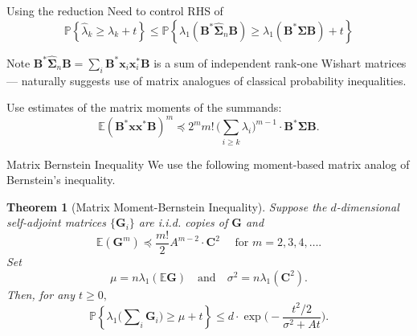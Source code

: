 \documentclass[xcolor={svgnames,pdftex,dvipsnames,table},10pt]{beamer} %
\newcommand{\mat}[1]{\ensuremath{\mathbf{#1}}}
\newcommand{\Prob}[1]{\ensuremath{\mathbb{P}\left\{#1 \right\}}}
\renewcommand{\star}{*}
\newcommand{\E}{\ensuremath{\mathbb{E}}}
\newcommand{\C}{\ensuremath{\mathbb{C}}}
\newtheorem*{thm}{Theorem}
\begin{document}

\begin{frame}{Using the reduction}
Need to control RHS of 
\[
\Prob{\hat{\lambda}_k \geq \lambda_k + t }
\leq
\Prob{
\lambda_1(\mat{B}^\star \widehat{\mat{\Sigma}}_n \mat{B}) \geq  
\lambda_1(\mat{B}^\star \mat{\Sigma} \mat{B}) + t 
}
\]

Note $\mat{B}^\star \widehat{\mat{\Sigma}}_n \mat{B} = \sum\nolimits_i \mat{B}^\star \mat{x}_i\mat{x}_i^\star \mat{B}$ is a sum of independent rank-one Wishart matrices --- naturally suggests use of matrix analogues of classical probability inequalities.

Use estimates of the matrix moments of the summands:
\[
\E(\mat{B}^\star \mat{x} \mat{x}^\star \mat{B})^m \preceq 2^m m!\, \Big(\sum_{i \geq k} \lambda_i\Big)^{m-1} \cdot \mat{B}^\star \mat{\Sigma} \mat{B}.
\]
\end{frame}

\begin{frame}{Matrix Bernstein Inequality }
 We use the following moment-based matrix analog of Bernstein's inequality.

\begin{thm}[Matrix Moment-Bernstein Inequality]
Suppose the $d$-dimensional self-adjoint matrices $\{\mat{G}_i\}$ are i.i.d. copies of $\mat{G}$ and 
\[ \E(\mat{G}^m) \preceq \frac{m!}{2} A^{m-2} \cdot \mat{C}^2 \quad \text{ for } m =2,3,4,\ldots.
\]
Set
\[ \mu = n \lambda_1(\E\mat{G}) \quad \text{and} \quad \sigma^2 = n\lambda_1(\mat{C}^2). \]
Then, for any $t \geq 0,$
\[	
 \Prob{ \lambda_1\Big(\sum\nolimits_i \mat{G}_i\Big) \geq \mu + t } \leq d \cdot \exp\Big(- \frac{t^2/2}{\sigma^2 + At} \Big).
\]
\end{thm}

\end{frame}
\end{document}
